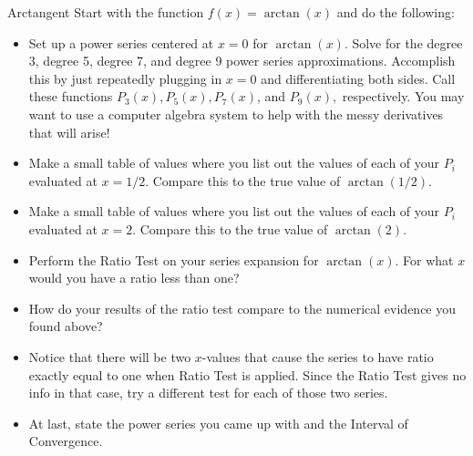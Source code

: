 \begin{exercise}{Arctangent \Coffeecup \Coffeecup \Coffeecup}
Start with the function $f(x)=\arctan(x)$ and do the following:

\begin{itemize}
\item Set up a power series centered at $x=0$ for $\arctan(x)$.  Solve for the degree 3, degree 5, degree 7, and degree 9 power series approximations.  Accomplish this by just repeatedly plugging in $x=0$ and differentiating both sides.  Call these functions $P_3(x), P_5(x), P_7(x)$, and $P_9(x),$ respectively.  You may want to use a computer algebra system to help with the messy derivatives that will arise!
\item Make a small table of values where you list out the values of each of your $P_i$ evaluated at $x=1/2$.  Compare this to the true value of $\arctan(1/2)$.  
\item Make a small table of values where you list out the values of each of your $P_i$ evaluated at $x=2$.  Compare this to the true value of $\arctan(2)$.
\item Perform the Ratio Test on your series expansion for $\arctan(x)$.  For what $x$ would you have a ratio less than one?
\item How do your results of the ratio test compare to the numerical evidence you found above?
\item Notice that there will be two $x$-values that cause the series to have ratio exactly equal to one when Ratio Test is applied.  Since the Ratio Test gives no info in that case, try a different test for each of those two series.  
\item At last, state the power series you came up with and the Interval of Convergence.
\end{itemize}
\end{exercise}

